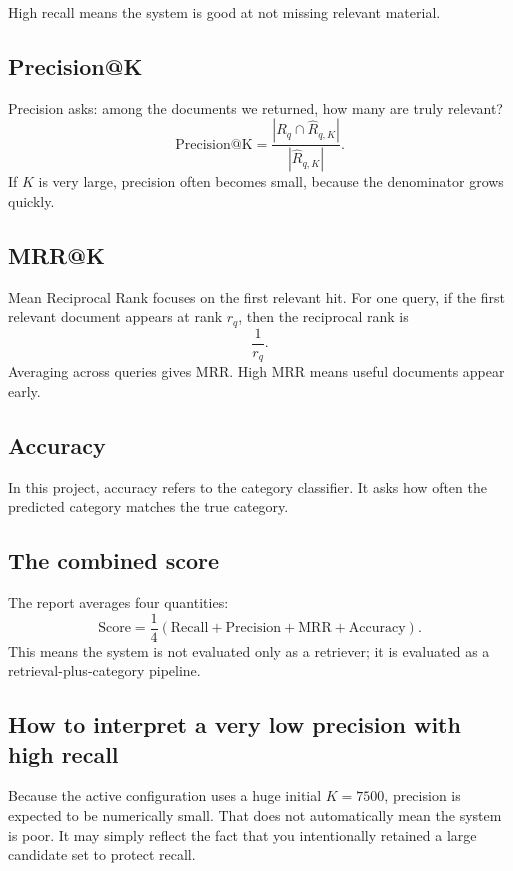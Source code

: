 \documentclass[10pt]{article}
\begin{document}
High recall means the system is good at not missing relevant material.

\subsection{Precision@K}

Precision asks: among the documents we returned, how many are truly relevant?
\[
\mathrm{Precision@K} = \frac{|R_q \cap \hat{R}_{q,K}|}{|\hat{R}_{q,K}|}.
\]
If \(K\) is very large, precision often becomes small, because the denominator grows quickly.

\subsection{MRR@K}

Mean Reciprocal Rank focuses on the first relevant hit. For one query, if the first relevant document appears at rank \(r_q\), then the reciprocal rank is
\[
\frac{1}{r_q}.
\]
Averaging across queries gives MRR. High MRR means useful documents appear early.

\subsection{Accuracy}

In this project, accuracy refers to the category classifier. It asks how often the predicted category matches the true category.

\subsection{The combined score}

The report averages four quantities:
\[
\mathrm{Score} = \frac{1}{4}(\mathrm{Recall} + \mathrm{Precision} + \mathrm{MRR} + \mathrm{Accuracy}).
\]
This means the system is not evaluated only as a retriever; it is evaluated as a retrieval-plus-category pipeline.

\subsection{How to interpret a very low precision with high recall}

Because the active configuration uses a huge initial \(K=7500\), precision is expected to be numerically small. That does not automatically mean the system is poor. It may simply reflect the fact that you intentionally retained a large candidate set to protect recall.
\end{document}
